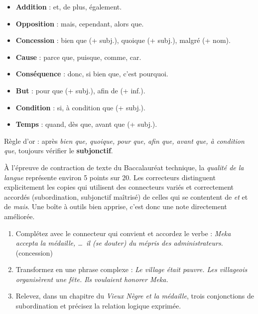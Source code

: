 \documentclass[11pt]{article}
\begin{document}
\begin{aretenir}
\begin{itemize}
\item \textbf{Addition} : et, de plus, également.
\item \textbf{Opposition} : mais, cependant, alors que.
\item \textbf{Concession} : bien que (+ subj.), quoique (+ subj.), malgré (+ nom).
\item \textbf{Cause} : parce que, puisque, comme, car.
\item \textbf{Conséquence} : donc, si bien que, c'est pourquoi.
\item \textbf{But} : pour que (+ subj.), afin de (+ inf.).
\item \textbf{Condition} : si, à condition que (+ subj.).
\item \textbf{Temps} : quand, dès que, avant que (+ subj.).
\end{itemize}
Règle d'or : après \emph{bien que, quoique, pour que, afin que, avant que, à condition que}, toujours vérifier le \textbf{subjonctif}.
\end{aretenir}

\begin{savaistu}
À l'épreuve de contraction de texte du Baccalauréat technique, la \emph{qualité de la langue} représente environ 5 points sur 20. Les correcteurs distinguent explicitement les copies qui utilisent des connecteurs variés et correctement accordés (subordination, subjonctif maîtrisé) de celles qui se contentent de \emph{et} et de \emph{mais}. Une boîte à outils bien apprise, c'est donc une note directement améliorée.
\end{savaistu}

\begin{exercice}[Entraînement]
\begin{enumerate}
\item Complétez avec le connecteur qui convient et accordez le verbe : \emph{Meka accepta la médaille, \dots\ il (se douter) du mépris des administrateurs.} (concession)
\item Transformez en une phrase complexe : \emph{Le village était pauvre. Les villageois organisèrent une fête. Ils voulaient honorer Meka.}
\item Relevez, dans un chapitre du \emph{Vieux Nègre et la médaille}, trois conjonctions de subordination et précisez la relation logique exprimée.
\end{enumerate}
\end{exercice}
\end{document}
